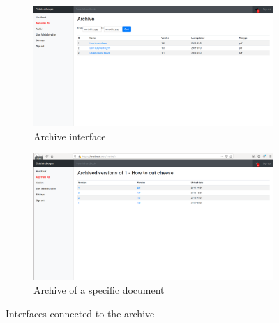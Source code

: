 \begin{figure}[H]
	\centering
	\begin{subfigure}[b]{0.48\textwidth}
		\includegraphics[width=\textwidth]{billeder/iteration1Prototyper/Archive.png}
		\caption{Archive interface}
		\label{fig:3-archive}
	\end{subfigure}
	\quad
	\begin{subfigure}[b]{0.48\textwidth}
		\includegraphics[width=\textwidth]{billeder/iteration1Prototyper/Archive-Version1.png}
		\caption{Archive of a specific document}
		\label{fig:3-ArchiveVersion}
	\end{subfigure}
	\caption{Interfaces connected to the archive}\label{fig:3-ArchivePages}
\end{figure}
